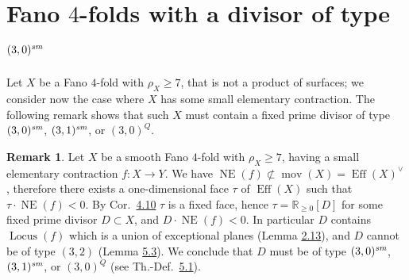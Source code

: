 \documentclass[10pt,a4paper]{amsart}
\theoremstyle{definition}
\newtheorem{remark}[thm]{Remark}
\numberwithin{figure}{section}
\numberwithin{table}{section}
\newcommand{\R}{\mathbb{R}}
\newcommand{\NE}{\operatorname{NE}}
\newcommand{\Lo}{\operatorname{Locus}}
\newcommand{\Eff}{\operatorname{Eff}}
\newcommand{\mov}{\operatorname{mov}}
\newcommand{\sm}{\text{\it sm}}
\begin{document}
\section{Fano $4$-folds with a  divisor of type $(3,0)^{\sm}$}\label{sec30}
\noindent Let $X$ be a Fano $4$-fold with $\rho_X\geq 7$, that is not a product of surfaces; we consider now the case where $X$ has some small elementary contraction.  The following remark shows that such $X$ must contain a fixed prime divisor  of type $(3,0)^{\sm}$, $(3,1)^{\sm}$, or $(3,0)^Q$.
 \begin{remark}\label{united}
Let $X$ be a smooth Fano $4$-fold with $\rho_X\geq 7$, having a small elementary contraction $f\colon X\to Y$. We have $\NE(f)\not\subset\mov(X)=\Eff(X)^{\vee}$, therefore there exists a one-dimensional face $\tau$ of $\Eff(X)$ such that $\tau\cdot\NE(f)<0$. By Cor.~\href{https://arxiv.org/abs/2508.21207v1}{4.10} $\tau$ is a fixed face, hence $\tau=\R_{\geq 0}[D]$ for some  fixed prime divisor $D\subset X$, and $D\cdot\NE(f)<0$. In particular $D$ contains $\Lo(f)$ which is a union of exceptional planes (Lemma \href{https://arxiv.org/abs/2508.21207v1}{2.13}), and $D$ cannot be of type $(3,2)$ (Lemma \href{https://arxiv.org/abs/2508.21207v1}{5.3}). We conclude that $D$ must be of type $(3,0)^{\sm}$, $(3,1)^{\sm}$, or $(3,0)^Q$ (see Th.-Def.~\href{https://arxiv.org/abs/2508.21207v1}{5.1}).
          \end{remark}
\end{document}
